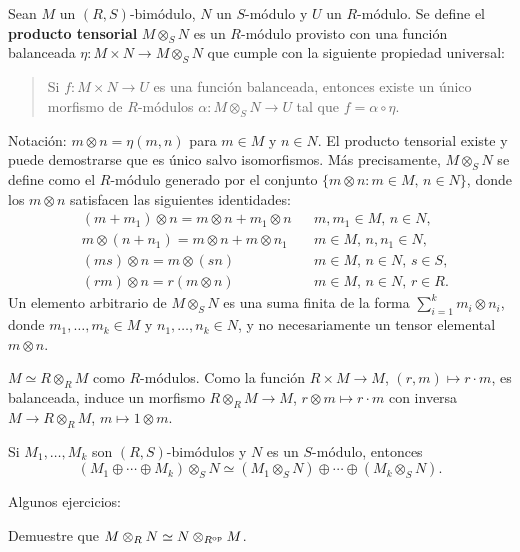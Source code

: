 Sean $M$ un $(R,S)$-bimódulo, $N$ un $S$-módulo y $U$ un $R$-módulo. 
Se define el \textbf{producto tensorial} $M\otimes_S N$ es un $R$-módulo provisto con una función balanceada 
$\eta\colon M\times N\to M\otimes_S N$ que cumple con la siguiente propiedad universal: 
\begin{quote}
Si $f\colon M\times N\to U$ es una función balanceada, entonces
existe un único morfismo de $R$-módulos $\alpha\colon M\otimes_S N\to U$ tal que $f=\alpha\circ\eta$. 
\end{quote}
Notación: $m\otimes n=\eta(m,n)$ para $m\in M$ y $n\in N$.
El producto tensorial existe y puede demostrarse que es único salvo isomorfismos. Más precisamente, $M\otimes_S N$
se define como el $R$-módulo generado por
el conjunto $\{m\otimes n:m\in M,\,n\in N\}$, donde los $m\otimes n$ satisfacen 
las siguientes identidades:
\begin{align}
    &(m+m_1)\otimes n=m\otimes n+m_1\otimes n &&\text{$m,m_1\in M$, $n\in N$},\\
    &m\otimes(n+n_1)=m\otimes n+m\otimes n_1 &&\text{$m\in M$, $n,n_1\in N$},\\
    &(ms)\otimes n=m\otimes (sn) &&\text{$m\in M$, $n\in N$, $s\in S$},\\
    &(rm)\otimes n=r(m\otimes n) &&\text{$m\in M$, $n\in N$, $r\in R$}.
\end{align}
Un elemento arbitrario de $M\otimes_S N$ es una suma finita
de la forma 
$\sum_{i=1}^k m_i\otimes n_i$,
donde $m_1,\dots,m_k\in M$ y $n_1,\dots,n_k\in N$, y no necesariamente un tensor elemental $m\otimes n$. 

\begin{example}
$M\simeq R\otimes_R M$ como $R$-módulos. Como la función $R\times M\to M$, $(r,m)\mapsto r\cdot m$, es balanceada, 
induce un morfismo $R\otimes_R M\to M$, $r\otimes m\mapsto r\cdot m$ con inversa $M\to R\otimes_R M$, $m\mapsto 1\otimes m$. 
\end{example}

\begin{example}
Si $M_1,\dots,M_k$ son $(R,S)$-bimódulos y $N$ es un $S$-módulo, entonces
\[
(M_1\oplus\cdots\oplus M_k)\otimes_S N\simeq (M_1\otimes_S N)\oplus\cdots\oplus (M_k\otimes_S N).
\]
\end{example}

Algunos ejercicios:

\begin{exercise}
    Demuestre que $M\otimes_RN\simeq N\otimes_{R^{\operatorname{op}}}M$.
\end{exercise}

